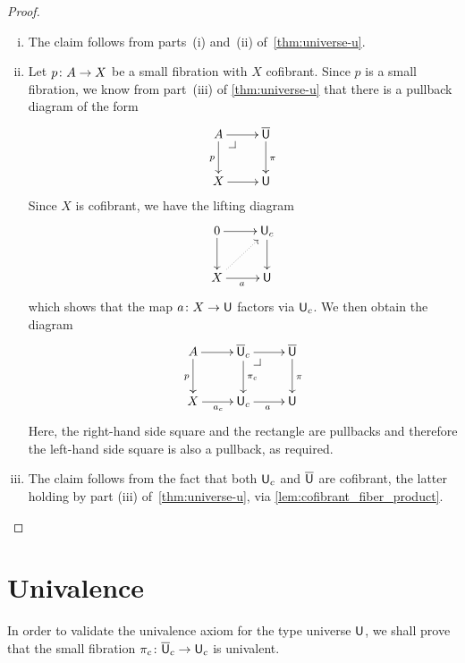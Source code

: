 \documentclass[reqno,10pt,a4paper,oneside,draft]{amsart}
\begin{document}
\begin{proof} \hfill
\begin{enumerate}[(i)] 
\item The claim follows from parts~(i) and~(ii) of~\cref{thm:universe-u}. 
\item Let $p \colon A \to X$ be a small fibration with $X$ cofibrant. Since $p$ is a
small fibration, we know 
from part~(iii) of \cref{thm:universe-u} that there is a pullback diagram of the form 
\[
\xymatrix{
A \ar[r] \ar[d]_p \drpullback & \UU \ar[d]^{\pi} \\
X \ar[r] & \U }
\]
Since $X$ is cofibrant, we have the lifting diagram
\[
\xymatrix{
0 \ar[r] \ar[d] & \U_c \ar[d]^{} \\
X \ar[r]_a \ar@{.>}[ur] & \U }
\]
which shows that the map $a \colon X \to \mathsf{U}$ factors via $\mathsf{U}_c$.  We then obtain the diagram
\[
\xymatrix{
A \ar[r] \ar[d]_p &  \UU_c \ar[r]  \ar[d]^{\pi_c} \drpullback & \UU \ar[d]^{\pi} \\
X \ar[r]_{a_c} & \U_c \ar[r]_{a} &  \U }
\]
Here, the right-hand side square and the rectangle are pullbacks and therefore the left-hand
side square is also a pullback, as required. 
\item The claim follows from the fact that both $\mathsf{U}_c$ and
$\overline{\mathsf{U}}$ are cofibrant, the latter holding by part (iii) of~\cref{thm:universe-u}, via \cref{lem:cofibrant_fiber_product}. \qedhere
\end{enumerate} 
\end{proof} 



\section{Univalence}



In order to validate the univalence axiom for the type universe $\mathsf{U}$, we shall prove that the small fibration 
$\pi_c \colon \overline{\mathsf{U}}_c \to \mathsf{U}_c$ is univalent. 
\end{document}
